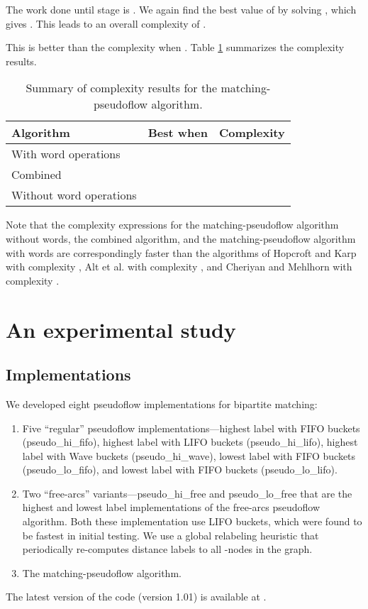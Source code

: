 \documentclass{article}
\begin{document}
 \smallskip

The work done until stage  is .  We again find the best value of  by solving , which gives .  This leads to an overall complexity of \mbox{}.

This is better than the  complexity when .
Table \ref{Table:complexitySummary} summarizes the complexity results.
\begin{table}[ht]
\begin{center}
\begin{tabular}{|l|l|l|} \hline
{\bf Algorithm} & {\bf Best when} & {\bf Complexity} \\ \hline \hline
With word operations &  & \\ \hline
Combined &  &  \\ \hline
Without word operations &  &  \\ \hline
\end{tabular}
\caption{\label{Table:complexitySummary}Summary of complexity results for the {\sf matching-pseudoflow} algorithm.}
\end{center}
\end{table}

Note that the complexity expressions for the matching-pseudoflow algorithm without words, the combined algorithm, and the matching-pseudoflow algorithm with words are correspondingly faster than the algorithms of Hopcroft and Karp \cite{HopK73} with complexity , Alt et al. \cite{AltBMP91} with complexity , and Cheriyan and Mehlhorn \cite{CheM96} with complexity .

\section{An experimental study}
\label{Sec:Expts}

\subsection{Implementations}

We developed eight pseudoflow implementations for bipartite matching:
\begin{enumerate}
\item Five ``regular'' pseudoflow implementations---highest label with FIFO buckets (pseudo\_hi\_fifo), highest label with LIFO buckets (pseudo\_hi\_lifo), highest label with Wave buckets (pseudo\_hi\_wave), lowest label with FIFO buckets (pseudo\_lo\_fifo), and lowest label with FIFO buckets (pseudo\_lo\_lifo).
\item Two ``free-arcs'' variants---{\sf pseudo\_hi\_free} and {\sf pseudo\_lo\_free} that are the highest and lowest label implementations of the free-arcs pseudoflow algorithm.  Both these implementation use LIFO buckets, which were found to be fastest in initial testing.  We use a global relabeling heuristic that periodically re-computes distance labels to all -nodes in the graph.
\item The {\sf matching-pseudoflow} algorithm.
\end{enumerate}
The latest version of the code (version 1.01) is available at \cite{WebPS}.
\end{document}
